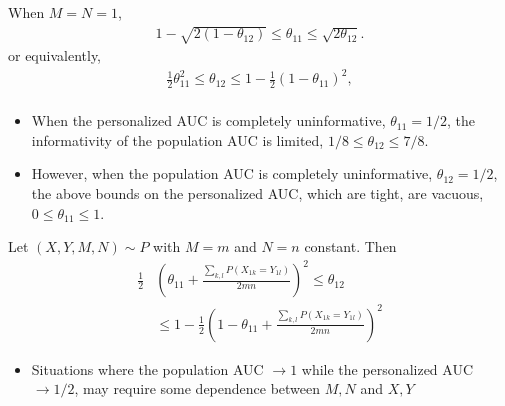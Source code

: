 \documentclass{beamer}
\renewcommand{\P}{P}
\newcommand{\cind}{\perp \!\!\! \perp}
\newcommand{\aucindiv}{\theta_{11}}%
\newcommand{\aucpop}{\theta_{12}}%
\begin{document}
\begin{frame}
When $M=N=1$,
\begin{align}
  1-\sqrt{2(1-\aucpop)} \le \aucindiv \le \sqrt{2\aucpop}.
\end{align}
or equivalently,
\begin{align}
  \frac{1}{2}\aucindiv^2 \le \aucpop \le 1 - \frac{1}{2}(1-\aucindiv)^2,\\
\end{align}

\begin{itemize}
\item When the personalized AUC is completely uninformative, $\aucindiv=1/2$,
the informativity of the population AUC is limited,
$1/8 \le \aucpop \le 7/8$.
\item However, when the population AUC is
  completely uninformative, $\aucpop=1/2$, the above bounds on the personalized AUC, which are tight, are vacuous, $0\le\aucindiv\le 1$.
\end{itemize}
\end{frame}

\begin{frame}
  \begin{theorem}\label{theorem:bounds}
    Let $(X,Y,M,N)\sim \P$ with $M=m$ and $N=n$  constant. Then
    \begin{align}
      \frac{1}{2}&\left(\aucindiv+\frac{\sum_{k,l}\P(X_{1k}=Y_{1l})}{2mn}\right)^2 \le \aucpop \\
      &\le 1-\frac{1}{2}\left(1-\aucindiv+\frac{\sum_{k,l}\P(X_{1k}=Y_{1l})}{2mn}\right)^2      
    \end{align}
  \end{theorem}
  \begin{itemize}
\item Situations where the population AUC $\to 1$ while the personalized AUC $\to 1/2$, may require some dependence between $M,N$ and $X,Y$
\end{itemize}
\end{frame}
\end{document}
